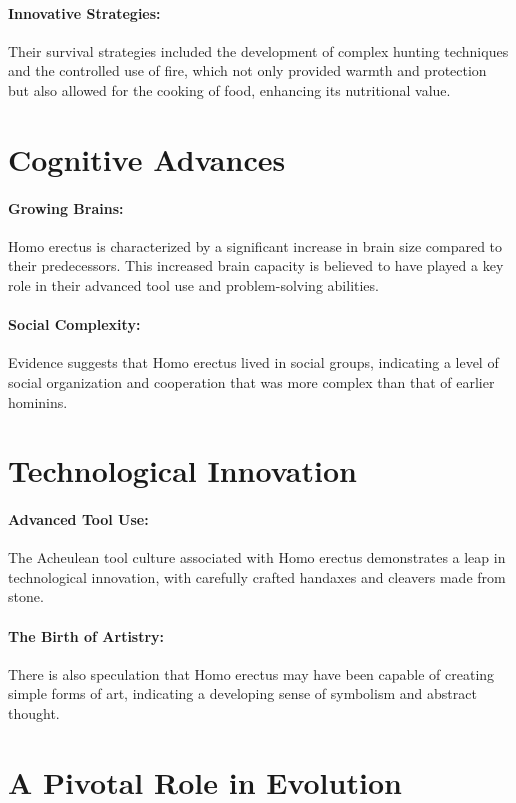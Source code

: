 \documentclass{book}
\begin{document}
\paragraph{Innovative Strategies:}
Their survival strategies included the development of complex hunting techniques and the controlled use of fire, which not only provided warmth and protection but also allowed for the cooking of food, enhancing its nutritional value.

\section*{Cognitive Advances}

\paragraph{Growing Brains:}
Homo erectus is characterized by a significant increase in brain size compared to their predecessors. This increased brain capacity is believed to have played a key role in their advanced tool use and problem-solving abilities.

\paragraph{Social Complexity:}
Evidence suggests that Homo erectus lived in social groups, indicating a level of social organization and cooperation that was more complex than that of earlier hominins.

\section*{Technological Innovation}

\paragraph{Advanced Tool Use:}
The Acheulean tool culture associated with Homo erectus demonstrates a leap in technological innovation, with carefully crafted handaxes and cleavers made from stone.

\paragraph{The Birth of Artistry:}
There is also speculation that Homo erectus may have been capable of creating simple forms of art, indicating a developing sense of symbolism and abstract thought.

\section*{A Pivotal Role in Evolution}
\end{document}
